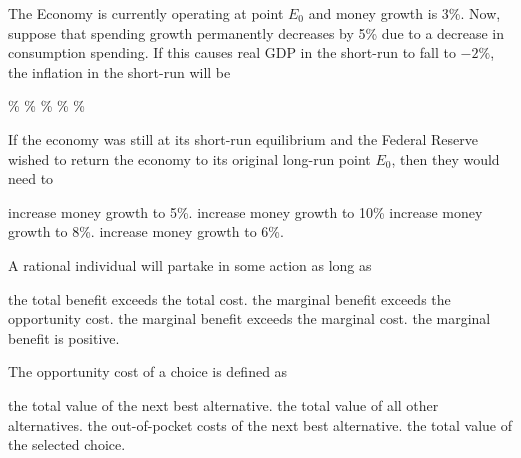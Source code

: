 \documentclass[addpoints,11pt]{exam}
\theoremstyle{definition}
\begin{document}
\begin{questions}
\question \label{MC39} The Economy is currently operating at point $E_0$ and money growth is 3\%. Now, suppose that spending growth permanently decreases by 5\% due to a decrease in consumption spending. If this causes real GDP in the short-run to fall to $-2\%$, the inflation in the short-run will be 

\begin{choices}
	\%
	\%
	\%
	\%
	\%
\end{choices}  

\question \label{MC40} If the economy was still at its short-run equilibrium and the Federal Reserve wished to return the economy to its original long-run point $E_0$, then they would need to

\begin{choices}
	\choice increase money growth to 5\%.
	\choice increase money growth to 10\%
	\CorrectChoice increase money growth to 8\%.
	\choice increase money growth to 6\%.
\end{choices}


\question A rational individual will partake in some action as long as

\begin{choices}
	\choice the total benefit exceeds the total cost.
	\choice the marginal benefit exceeds the opportunity cost.
	\CorrectChoice the marginal benefit exceeds the marginal cost.
	\choice the marginal benefit is positive.
\end{choices}

\newpage

\question The opportunity cost of a choice is defined as 

\begin{choices}
	\CorrectChoice the total value of the next best alternative.
	\choice the total value of all other alternatives.
	\choice the out-of-pocket costs of the next best alternative.
	\choice the total value of the selected choice.
\end{choices}




\end{questions}
\end{document}
